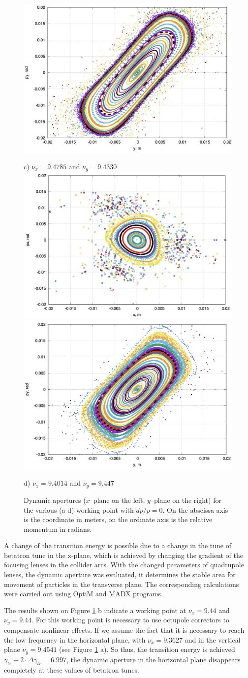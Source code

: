 \documentclass[a4paper]{jpconf}
\begin{document}
\begin{figure}[!htb]
    \includegraphics*[width=.3974\columnwidth]{img/WEPOPT004_f2-6}
    \par c) $\nu_{x}=9.4785$ and $\nu_{y}=9.4330$\\
    \includegraphics*[width=.3974\columnwidth]{img/WEPOPT004_f2-7}
    \includegraphics*[width=.3974\columnwidth]{img/WEPOPT004_f2-8}
    \par d) $\nu_{x}=9.4014$ and $\nu_{y}=9.447$\\
   \caption{Dynamic apertures ($x$–plane on the left, $y$–plane on the right) for the various (a-d) working point with $dp/p=0$. On the abscissa axis is the coordinate in meters, on the ordinate axis is the relative momentum in radians.}
   \label{fig:dyn_apertupes}
\end{figure}


\par A change of the transition energy is possible due to a change in the tune of betatron tune in the x-plane, which is achieved by changing the gradient of the focusing lenses in the collider arcs. With the changed parameters of quadrupole lenses, the dynamic aperture was evaluated, it determines the stable area for movement of particles in the transverse plane. The corresponding calculations were carried out using OptiM and MADX programs.
\par The results shown on Figure \ref{fig:dyn_apertupes} b indicate a working point at $\nu_{x}=9.44$ and $\nu_{y}=9.44$. For this working point is necessary to use octupole correctors to compensate nonlinear effects. If we assume the fact that it is necessary to reach the low frequency in the horizontal plane, with $\nu_{x}=9.3627$ and in the vertical plane $\nu_{y}=9.4541$ (see Figure \ref{fig:dyn_apertupes} a). So thus, the transition energy is achieved $\gamma_{tr}-2\cdot\Delta\gamma_{tr}=6.997$, the dynamic aperture in the horizontal plane disappears completely at these values of betatron tunes.
\end{document}
